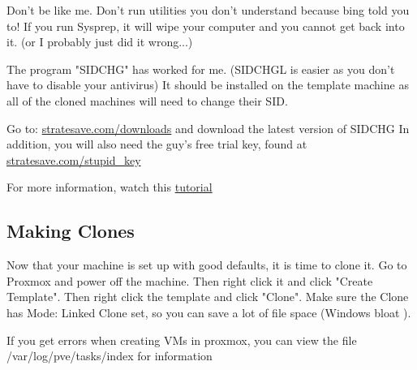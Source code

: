 \documentclass{article}
\begin{document}
Don’t be like me. Don’t run utilities you don’t understand because bing told you to!
If you run Sysprep, it will wipe your computer and you cannot get back into it. (or I probably just did it wrong...)

\noindent The program "SIDCHG" has worked for me. (SIDCHGL is easier as you don't have to disable your antivirus)
It should be installed on the template machine as all of the cloned machines will need to change their SID.

Go to: \href{https://www.stratesave.com/html/downloads.html}{stratesave.com/downloads}
and download the latest version of SIDCHG
In addition, you will also need the guy's free trial key, found at \href{https://www.stratesave.com/html/downloads.html}{stratesave.com/stupid\_key}

For more information, watch this \href{https://www.youtube.com/watch?v=4fImvgWayI0}{tutorial}

\subsection{Making Clones}
Now that your machine is set up with good defaults, it is time to clone it. Go to Proxmox and power off the machine. Then right click it and click "Create Template".
Then right click the template and click "Clone". Make sure the Clone has Mode: Linked Clone set, so you can save a lot of file space (Windows bloat \Vomey{}).

If you get errors when creating VMs in proxmox, you can view the file /var/log/pve/tasks/index for information
\end{document}
